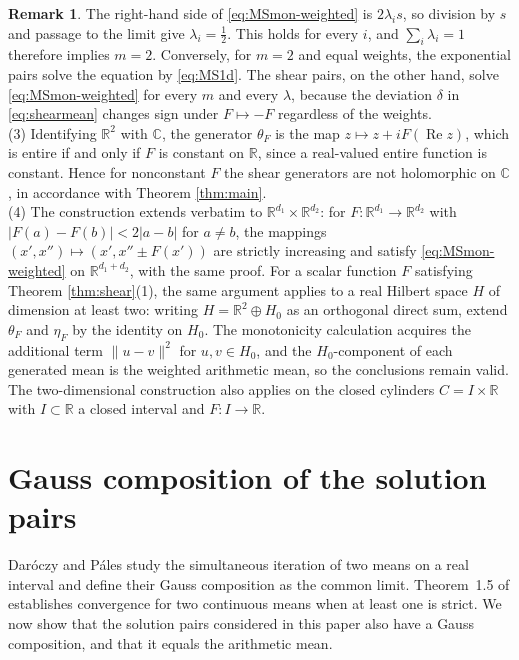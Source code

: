 \documentclass[a4paper, reqno, 11pt]{amsart}
\theoremstyle{definition}
\newtheorem{Rem}[Thm]{Remark}
\begin{document}
\begin{Rem}
The right-hand side of \eqref{eq:MSmon-weighted} is $2\lambda_i s$, so division by $s$ and passage to the limit give $\lambda_i=\tfrac{1}{2}$.
This holds for every $i$, and $\sum_i\lambda_i=1$ therefore implies $m=2$.
Conversely, for $m=2$ and equal weights, the exponential pairs solve the equation by \eqref{eq:MS1d}.
The shear pairs, on the other hand, solve \eqref{eq:MSmon-weighted} for every $m$ and every $\lambda$, because the deviation $\delta$ in \eqref{eq:shearmean} changes sign under $F \mapsto -F$ regardless of the weights. \\
(3) Identifying $\mathbb{R}^2$ with $\mathbb{C}$, the generator $\theta_F$ is the map $z \mapsto z + iF(\operatorname{Re} z)$, which is entire if and only if $F$ is constant on $\mathbb{R}$, since a real-valued entire function is constant.
Hence for nonconstant $F$ the shear generators are not holomorphic on $\mathbb{C}$, in accordance with Theorem \ref{thm:main}. \\
(4) The construction extends verbatim to $\mathbb{R}^{d_1} \times \mathbb{R}^{d_2}$: for $F \colon \mathbb{R}^{d_1} \to \mathbb{R}^{d_2}$ with $|F(a) - F(b)| < 2|a - b|$ for $a \neq b$, the mappings $(x', x'') \mapsto (x', x'' \pm F(x'))$ are strictly increasing and satisfy \eqref{eq:MSmon-weighted} on $\mathbb{R}^{d_1 + d_2}$, with the same proof.
For a scalar function $F$ satisfying Theorem \ref{thm:shear}(1), the same argument applies to a real Hilbert space $H$ of dimension at least two: writing $H=\mathbb{R}^2\oplus H_0$ as an orthogonal direct sum, extend $\theta_F$ and $\eta_F$ by the identity on $H_0$.
The monotonicity calculation acquires the additional term $\|u-v\|^2$ for $u,v\in H_0$, and the $H_0$-component of each generated mean is the weighted arithmetic mean, so the conclusions remain valid.
The two-dimensional construction also applies on the closed cylinders $C = I \times \mathbb{R}$ with $I \subset \mathbb{R}$ a closed interval and $F \colon I \to \mathbb{R}$.
\end{Rem}

\section{Gauss composition of the solution pairs}\label{sec:gauss}

Dar\'oczy and P\'ales \cite[Section~1.2]{DP} study the simultaneous iteration of two means on a real interval and define their Gauss composition as the common limit. 
Theorem~1.5 of \cite{DP} establishes convergence for two continuous means when at least one is strict. 
We now show that the solution pairs considered in this paper also have a Gauss composition, and that it equals the arithmetic mean.
\end{document}
